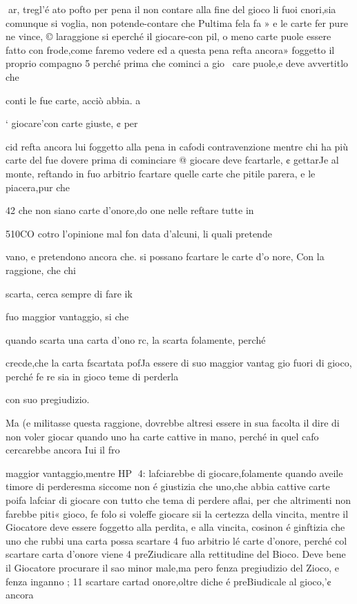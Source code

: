 \documentclass[12pt,a6paper]{article}
\begin{document}
 
ar,
tregl’é ato pofto per pena il
non contare alla fine del gioco
li fuoi cnori,sia comunque si voglia, non potende-contare che
Pultima fela fa » e le carte fer
pure ne vince, © laraggione si
eperché il giocare-con pil, o
meno carte puole essere fatto
con frode,come faremo vedere
ed a questa pena refta ancora»
foggetto il proprio compagno 5
perché prima che cominci a gio~
care puole,e deve avvertitlo che

conti le fue carte, acciò abbia. a

‘ giocare'con carte giuste, ¢ per

cid refta ancora lui foggetto alla
pena in cafodi contravenzione
mentre chi ha più carte del fue
dovere prima di cominciare @
giocare deve fcartarle, ¢ gettarJe al monte, reftando in fuo arbitrio fcartare quelle carte che
pitile parera, e le piacera,pur
che
 

 

 

42
che non siano carte d’onore,do
one nelle reftare tutte in

510CO cotro l’opinione mal fon
data d’alcuni, li quali pretende~

vano, e pretendono ancora che.
si possano fcartare le carte d’o
nore, Con la raggione, che chi

scarta, cerca sempre di fare ik

fuo maggior vantaggio, si che

quando scarta una carta d’ono
rc, la scarta folamente, perché

crecde,che la carta fscartata pofJa essere di suo maggior vantag
gio fuori di gioco, perché fe re
sia in gioco teme di perderla

con suo pregiudizio.

Ma (e militasse questa raggione, dovrebbe altresi essere in
sua facolta il dire di non voler
giocar quando uno ha carte cattive in mano, perché in quel cafo cercarebbe ancora Iui il fro

maggior vantaggio,mentre HP
4:
lafciarebbe di giocare,folamente quando aveile timore di perderesma siccome non é giustizia
che uno,che abbia cattive carte
poifa lafciar di giocare con tutto che tema di perdere aflai, per
che altrimenti non farebbe piti«
gioco, fe folo si voleffe giocare
sii la certezza della vincita,
mentre il Giocatore deve essere foggetto alla perdita, e alla vincita, cosinon é ginftizia
che uno che rubbi una carta
possa scartare 4 fuo arbitrio lé
carte d’onore, perché col scartare carta d’onore viene 4 preZiudicare alla rettitudine del
Bioco. Deve bene il Giocatore
procurare il sao minor male,ma
pero fenza pregiudizio del Zioco, e fenza inganno ; 11 scartare
cartad onore,oltre diche é preBiudicale al gioco,'¢ ancora
\end{document}
